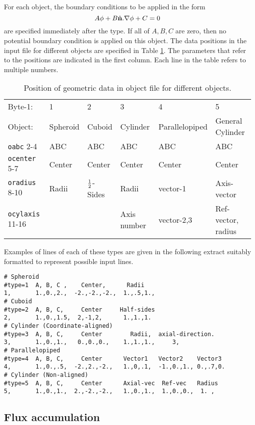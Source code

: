 \documentclass[12pt]{article}
\begin{document}
\bigskip
For each object, the boundary conditions to be applied in the form 
$$A\phi + B \hat{\bf n}.\nabla\phi + C =0$$
are specified immediately after the type. If all of $A,B,C$ are zero,
then no potential boundary condition is applied on this object. The data
positions in the input file for different objects are specified in
Table \ref{geomtable}. The parameters that refer to the positions are
indicated in the first column. Each line in the table refers to
multiple numbers.
\begin{table}[htp]
\caption{Position of geometric data in object file for different objects.\label{geomtable}}
\begin{tabular}{|l|l|l|l|l|l|}
\hline
  Byte-1: & 1& 2& 3& 4& 5\\
  Object: & Spheroid& Cuboid& Cylinder& Parallelopiped& General
  Cylinder\\
\hline
\verb!oabc! 2-4 & ABC  & ABC  & ABC  & ABC  & ABC 
\\
\verb!ocenter! 5-7 & Center& Center& Center& Center& Center\\
\verb!oradius! 8-10 & Radii& ${1\over2}$-Sides&
Radii&  vector-1& Axis-vector\\
\verb!ocylaxis! 11-16 & & & Axis number& vector-2,3& Ref-vector, radius\\ 
\hline
\end{tabular}
\end{table}


Examples of lines of each of these types are given in the following
extract suitably formatted to represent possible input lines.
\begin{verbatim}
# Spheroid
#type=1  A, B, C ,    Center,      Radii
1,       1.,0.,2.,  -2.,-2.,-2.,  1.,.5,1., 
# Cuboid
#type=2  A, B, C,     Center     Half-sides
2,       1.,0.,1.5,  2,-1,2,      1.,1.,1.
# Cylinder (Coordinate-aligned)
#type=3  A, B, C,     Center        Radii,  axial-direction. 
3,       1.,0.,1.,   0.,0.,0.,    1.,1.,1.,     3,
# Parallelopiped
#type=4  A, B, C,     Center      Vector1   Vector2    Vector3
4,       1.,0.,.5,  -2.,2.,-2.,   1.,0,.1,  -1.,0.,1., 0.,.7,0.
# Cylinder (Non-aligned)
#type=5  A, B, C,     Center      Axial-vec  Ref-vec   Radius
5,       1.,0.,1.,  2.,-2.,-2.,   1.,0.,1.,  1.,0.,0.,  1. ,
\end{verbatim}

\subsection{Flux accumulation}
\end{document}

